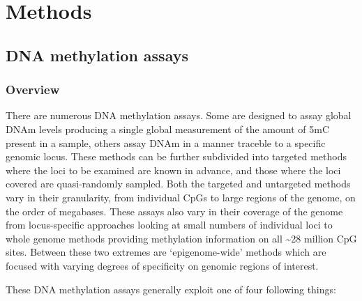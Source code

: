 \documentclass[]{book}
\begin{document}
\hypertarget{methods}{%
\chapter{Methods}\label{methods}}

\hypertarget{dna-methylation-assays}{%
\section{DNA methylation assays}\label{dna-methylation-assays}}

\hypertarget{overview}{%
\subsection{Overview}\label{overview}}

There are numerous DNA methylation assays. Some are designed to assay global DNAm levels producing a single global measurement of the amount of 5mC present in a sample, others assay DNAm in a manner traceble to a specific genomic locus. These methods can be further subdivided into targeted methods where the loci to be examined are known in advance, and those where the loci covered are quasi-randomly sampled. Both the targeted and untargeted methods vary in their granularity, from individual CpGs to large regions of the genome, on the order of megabases. These assays also vary in their coverage of the genome from locus-specific approaches looking at small numbers of individual loci to whole genome methods providing methylation information on all \textasciitilde28 million CpG sites. Between these two extremes are `epigenome-wide' methods which are focused with varying degrees of specificity on genomic regions of interest.

These DNA methylation assays generally exploit one of four following things:
\end{document}
